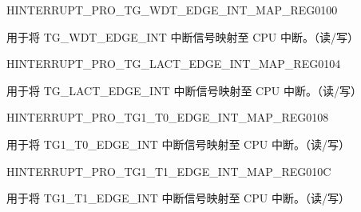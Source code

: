 \begin{register}{H}{INTERRUPT\_PRO\_TG\_WDT\_EDGE\_INT\_MAP\_REG}{\hexprefix{}0100}\label{regdesc:INTERRUPTPROTGWDTEDGEINTMAPREG}
%
%
\regnewline%
\begin{regdesc}\begin{reglist}
\label{fielddesc:INTERRUPTPROTGWDTEDGEINTMAP}\item [INTERRUPT\_PRO\_TG\_WDT\_EDGE\_INT\_MAP] 用于将 TG\_WDT\_EDGE\_INT 中断信号映射至 CPU 中断。（读/写）
\end{reglist}\end{regdesc}
\end{register}


\begin{register}{H}{INTERRUPT\_PRO\_TG\_LACT\_EDGE\_INT\_MAP\_REG}{\hexprefix{}0104}\label{regdesc:INTERRUPTPROTGLACTEDGEINTMAPREG}
%
%
\regnewline%
\begin{regdesc}\begin{reglist}
\label{fielddesc:INTERRUPTPROTGLACTEDGEINTMAP}\item [INTERRUPT\_PRO\_TG\_LACT\_EDGE\_INT\_MAP] 用于将 TG\_LACT\_EDGE\_INT 中断信号映射至 CPU 中断。（读/写）
\end{reglist}\end{regdesc}
\end{register}


\begin{register}{H}{INTERRUPT\_PRO\_TG1\_T0\_EDGE\_INT\_MAP\_REG}{\hexprefix{}0108}\label{regdesc:INTERRUPTPROTG1T0EDGEINTMAPREG}
%
%
\regnewline%
\begin{regdesc}\begin{reglist}
\label{fielddesc:INTERRUPTPROTG1T0EDGEINTMAP}\item [INTERRUPT\_PRO\_TG1\_T0\_EDGE\_INT\_MAP] 用于将 TG1\_T0\_EDGE\_INT 中断信号映射至 CPU 中断。（读/写）
\end{reglist}\end{regdesc}
\end{register}


\begin{register}{H}{INTERRUPT\_PRO\_TG1\_T1\_EDGE\_INT\_MAP\_REG}{\hexprefix{}010C}\label{regdesc:INTERRUPTPROTG1T1EDGEINTMAPREG}
%
%
\regnewline%
\begin{regdesc}\begin{reglist}
\label{fielddesc:INTERRUPTPROTG1T1EDGEINTMAP}\item [INTERRUPT\_PRO\_TG1\_T1\_EDGE\_INT\_MAP] 用于将 TG1\_T1\_EDGE\_INT 中断信号映射至 CPU 中断。（读/写）
\end{reglist}\end{regdesc}
\end{register}



